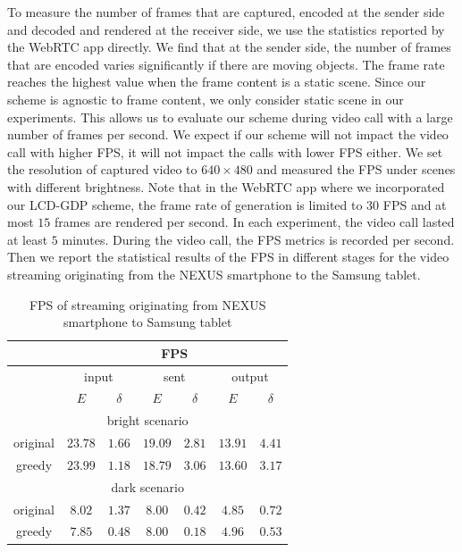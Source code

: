 To measure the number of frames that are captured, encoded at the
sender side and decoded and rendered at the receiver side, we use the
statistics reported by the WebRTC app directly.  We find that at the
sender side, the number of frames that are encoded varies
significantly if there are moving objects.  The frame rate reaches the
highest value when the frame content is a static scene.  Since our
scheme is agnostic to frame content, we only consider static scene in
our experiments.  This allows us to evaluate our scheme during video
call with a large number of frames per second.  We expect if our scheme
will not impact the video call with higher FPS, it will not impact the
calls with lower FPS either.  We set the resolution of captured video
to $640\times 480$ and measured the FPS under scenes with different
brightness.  Note that in the WebRTC app where we incorporated our
LCD-GDP scheme, the frame rate of generation is limited to $30$ FPS
and at most $15$ frames are rendered per second. In each experiment,
the video call lasted at least $5$ minutes. During the video call, the FPS metrics is recorded per second. 
Then we report the statistical results of the FPS in different stages for the
video streaming originating from the NEXUS smartphone to the Samsung tablet.



\begin{table}[h]
  \small
  \centering
  \caption{FPS of streaming originating from NEXUS smartphone to
    Samsung tablet}
  \label{tab:fps}
  \begin{tabular}{|c|c|c|c|c|c|c|} %
    \hline
    & \multicolumn{6}{|c|}{FPS} \\ \hline
    & \multicolumn{2}{|c|}{input} & \multicolumn{2}{|c|}{sent}
    & \multicolumn{2}{|c|}{output}
    \\ \hline
    & $E$ & $\delta$ & $E$ & $\delta$ & $E$ & $\delta$ \\ \hline
    \multicolumn{7}{|c|}{bright scenario} \\ \hline
    original & $23.78$ & $1.66$ & $19.09$ & $2.81$ & $13.91$ & $4.41$ 
    \\ \hline
    greedy & $23.99$ & $1.18$ & $18.79$ & $3.06$ & $13.60$ & $3.17$
    \\ \hline
    \multicolumn{7}{|c|}{dark scenario} \\ \hline
    original & $8.02$ & $1.37$ & $8.00$ & $0.42$ & $4.85$ & $0.72$ \\ \hline
    greedy & $7.85$ & $0.48$ & $8.00$ & $0.18$ & $4.96$ & $0.53$ \\ \hline
  \end{tabular}
  
\end{table}



